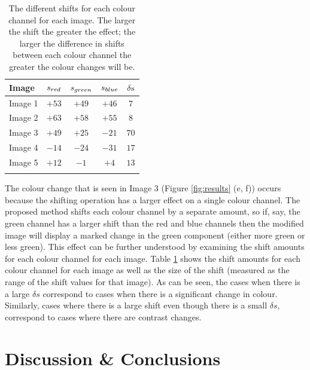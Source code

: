 \documentclass[journal,transmag]{IEEEtran}
\begin{document}
\begin{table}[t]
\centering
\normalsize{
\begin{tabular}{ l c c c c}

	\toprule
  Image	&	$s_{\mbox{\tiny{red}}}$	& $s_{\mbox{\tiny{green}}}$	& $s_{\mbox{\tiny{blue}}}$  & $\delta s$\\
  \midrule
  Image 1	&      $+53$				& $+49$					& $+46$ 				& $7$\\
  Image 2	&      $+63$				& $+58$					& $+55$ 				& $8$ \\	
  Image 3	&      $+49$				& $+25$					& $-21$ 				& $70$\\
  Image 4	&      $-14$				& $-24$					& $-31$ 				& $17$ \\
  Image 5	&      $+12$				& $-1$					& $+4$ 				& $13$\\
  \bottomrule
  \vspace{5pt}
\end{tabular}
}
\caption{The different shifts for each colour channel for each image.  The larger the shift the greater the effect; the larger the difference in shifts between each colour channel the greater the colour changes will be.}
\label{tbl:shifts}
\end{table}

The colour change that is seen in Image 3 (Figure \ref{fig:results} (e, f)) occurs because the shifting operation has a larger effect on a single colour channel.  The proposed method shifts each colour channel by a separate amount, so if, say, the green channel has a larger shift than the red and blue channels then the modified image will display a marked change in the green component (either more green or less green).  This effect can be further understood by examining the shift amounts for each colour channel for each image.   Table \ref{tbl:shifts} shows the shift amounts for each colour channel for each image as well as the size of the shift (measured as the range of the shift values for that image).  As can be seen, the cases when there is a large $\delta s$ correspond to cases when there is a significant change in colour.   Similarly, cases where there is a large shift even though there is a small $\delta s$, correspond to cases where there are contrast changes.




\section{Discussion \& Conclusions}
\label{sec:discussion}
\end{document}
